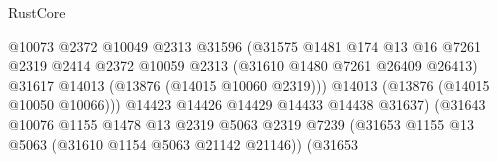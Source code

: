 \begin{lexlean}{RustCore}
\begin{coremodule}
                                                    @10073
                                                    @2372
                                                    @10049
                                                    @2313
                                                    @31596
                                                    (@31575
                                                      @1481
                                                      @174
                                                      @13
                                                      @16
                                                      @7261
                                                      @2319
                                                      @2414
                                                      @2372
                                                      @10059
                                                      @2313
                                                      (@31610 @1480 @7261 @26409 @26413)
                                                      @31617
                                                      @14013
                                                      (@13876 (@14015 @10060 @2319)))
                                                    @14013
                                                    (@13876 (@14015 @10050 @10066)))
                                                  @14423
                                                  @14426
                                                  @14429
                                                  @14433
                                                  @14438
                                                  @31637)
                                                (@31643
                                                  @10076
                                                  @1155
                                                  @1478
                                                  @13
                                                  @2319
                                                  @5063
                                                  @2319
                                                  @7239
                                                  (@31653
                                                    @1155
                                                    @13
                                                    @5063
                                                    (@31610 @1154 @5063 @21142 @21146))
                                                  (@31653

\end{coremodule}
\end{lexlean}
